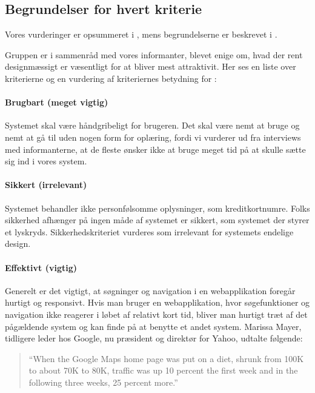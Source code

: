 \subsection{Begrundelser for hvert kriterie}
\label{sec:begrundelsekriterier}

Vores vurderinger er opsummeret i , mens begrundelserne er beskrevet i .



Gruppen er i sammenråd med vores informanter, blevet enige om, hvad der rent designmæssigt er væsentligt for at \Foodl{} bliver mest attraktivit. Her ses en liste over kriterierne og en vurdering af kriteriernes betydning for \Foodl{}:

\paragraph{Brugbart (meget vigtig)} 
Systemet skal være håndgribeligt for brugeren. Det skal være nemt at bruge og nemt at gå til uden nogen form for oplæring, fordi vi vurderer ud fra interviews med informanterne, at de fleste ønsker ikke at bruge meget tid på at skulle sætte sig ind i vores system. 

\paragraph{Sikkert (irrelevant)} 
Systemet behandler ikke personfølsomme oplysninger, som \fx kreditkortnumre. Folks sikkerhed afhænger på ingen måde af systemet er sikkert, som \fx systemet der styrer et lyskryds. Sikkerhedskriteriet vurderes som irrelevant for systemets endelige design.

\paragraph{Effektivt (vigtig)} 
Generelt er det vigtigt, at søgninger og navigation i en webapplikation foregår hurtigt og responsivt. Hvis man bruger en webapplikation, hvor søgefunktioner og navigation ikke reagerer i løbet af relativt kort tid, bliver man hurtigt træt af det pågældende system og kan finde på at benytte et andet system. Marissa Mayer, tidligere leder hos Google, nu præsident og direktør for Yahoo, udtalte følgende: \cite{googlespeed}

\begin{quote}
``When the Google Maps home page was put on a diet, shrunk from 100K to about 70K to 80K, traffic was up 10 percent the first week and in the following three weeks, 25 percent more.''
\end{quote}  


